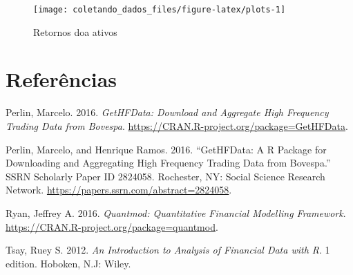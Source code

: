 \documentclass[]{article}
\begin{document}
\begin{figure}[h]

{\centering \texttt{[image: coletando\_dados\_files/figure-latex/plots-1]} 

}

\caption{Retornos doa ativos}\label{fig:plots}
\end{figure}

\section*{Referências}\label{referencias}

\setlength{\parindent}{0in}

\hypertarget{refs}{}
\hypertarget{ref-perlinux5fgethfdata:ux5f2016}{}
Perlin, Marcelo. 2016. \emph{GetHFData: Download and Aggregate High
Frequency Trading Data from Bovespa}.
\url{https://CRAN.R-project.org/package=GetHFData}.

\hypertarget{ref-perlinux5fgethfdata:ux5f2016-1}{}
Perlin, Marcelo, and Henrique Ramos. 2016. ``GetHFData: A R Package for
Downloading and Aggregating High Frequency Trading Data from Bovespa.''
SSRN Scholarly Paper ID 2824058. Rochester, NY: Social Science Research
Network. \url{https://papers.ssrn.com/abstract=2824058}.

\hypertarget{ref-ryanux5fquantmod:ux5f2016}{}
Ryan, Jeffrey A. 2016. \emph{Quantmod: Quantitative Financial Modelling
Framework}. \url{https://CRAN.R-project.org/package=quantmod}.

\hypertarget{ref-tsayux5fintroductionux5f2012}{}
Tsay, Ruey S. 2012. \emph{An Introduction to Analysis of Financial Data
with R}. 1 edition. Hoboken, N.J: Wiley.
\end{document}
